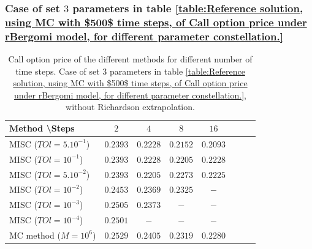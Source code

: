 \documentclass[11pt]{article}
\begin{document}
\subsubsection{Case of set $3$ parameters in table \ref{table:Reference solution, using MC with $500$ time steps, of Call option price under rBergomi model, for different parameter constellation.}}\label{sec:Case of set 3 parameters}
\begin{table}[h!]
	\centering
	\begin{tabular}{l*{6}{c}r}
		Method \textbackslash  Steps            & $2$ & $4$ & $8$ & $16$ &   \\
		\hline
		MISC ($TOl=5.10^{-1}$)  & $0.2393$ & $0.2228$ & $0.2152$ & $0.2093$  \\
		MISC ($TOl=10^{-1}$)  & $0.2393$ & $0.2228$ & $0.2205$ & $0.2228$  \\
		MISC ($TOl=5.10^{-2}$)  & $0.2393$ & $0.2205$ & $0.2273$ & $0.2225$  \\
		MISC ($TOl=10^{-2}$)  & $0.2453$ & $0.2369$ & $0.2325$ & $-$  \\
		MISC ($TOl=10^{-3}$)  & $0.2505$ & $0.2373$ & $-$ & $-$  \\
		MISC ($TOl=10^{-4}$)  & $0.2501$ & $-$ & $-$ & $-$  \\
		\hline
		MC method ($M=10^{6}$)   & $ 0.2529$ & $  0.2405$  & $ 0.2319
		$ & $   0.2280$ \\		
		
		\hline
	\end{tabular}
	\caption{ Call option price of the different methods for different number of time steps. Case of set $3$ parameters in table \ref{table:Reference solution, using MC with $500$ time steps, of Call option price under rBergomi model, for different parameter constellation.}, without Richardson extrapolation.}
	\label{table: Call option price of the different methods for different number of time steps. Case set 3}
\end{table}
\end{document}
